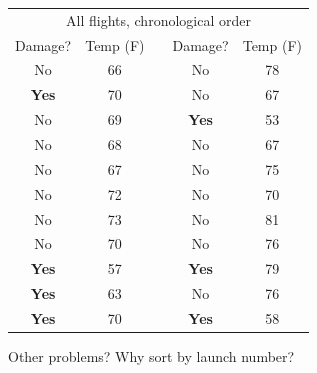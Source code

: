 \documentclass[pdflatex,landscape,titlepage]{foils}
\begin{document}
\begin{center}
\begin{tabular}{ccccc}
\toprule
\multicolumn{5}{c}{All flights, chronological order}\\
Damage? &       Temp (F)        &      \quad \quad \quad        &       Damage? &       Temp (F)        \\
\midrule
No      &       66      &               &       No      &       78      \\
\color{red}\textbf{Yes}    &     \color{red}  70      &               &       No      &       67      \\
No      &       69      &               &     \color{red}   \textbf{Yes}    & \color{red}       53      \\
No      &       68      &               &       No      &       67      \\
No      &       67      &               &       No      &       75      \\
No      &       72      &               &       No      &       70      \\
No      &       73      &               &       No      &       81      \\
No      &       70      &               &       No      &       76      \\
\color{red} \textbf{Yes}    &   \color{red}     57      &               &       \color{red} \textbf{Yes}    &   \color{red}     79      \\
\color{red} \textbf{Yes}    &   \color{red}     63      &               &       No      &       76      \\
\color{red} \textbf{Yes}    &   \color{red}     70      &               &       \color{red} \textbf{Yes}    &   \color{red}     58      \\
\bottomrule
\end{tabular}
\end{center}

Other problems?  \pause Why sort by launch number?

\end{document}

